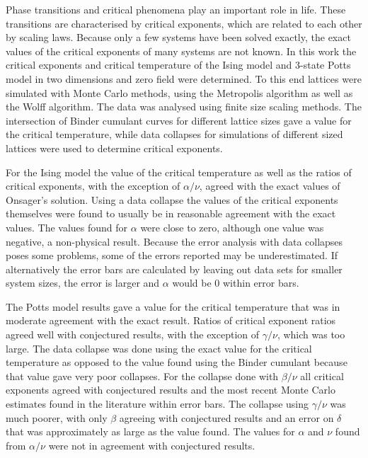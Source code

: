 \documentclass[11pt, a4paper]{report} %
\begin{document}
Phase transitions and critical phenomena play an important role in life.
These transitions are characterised by critical exponents, which are related to each other by scaling laws.
Because only a few systems have been solved exactly, the exact values of the critical exponents of many systems are not known.
In this work the critical exponents and critical temperature of the Ising model and 3-state Potts model in two dimensions and zero field were determined.
To this end lattices were simulated with Monte Carlo methods, using the Metropolis algorithm as well as the Wolff algorithm.
The data was analysed using finite size scaling methods.
The intersection of Binder cumulant curves for different lattice sizes gave a value for the critical temperature, while data collapses for simulations of different sized lattices were used to determine critical exponents.

For the Ising model the value of the critical temperature as well as the ratios of critical exponents, with the exception of \(\alpha/\nu\), agreed with the exact values of Onsager's solution.
Using a data collapse the values of the critical exponents themselves were found to usually be in reasonable agreement with the exact values. The values found for \(\alpha\) were close to zero, although one value was negative, a non-physical result.
Because the error analysis with data collapses poses some problems, some of the errors reported may be underestimated.
If alternatively the error bars are calculated by leaving out data sets for smaller system sizes, the error is larger and \(\alpha\) would be 0 within error bars.

The Potts model results gave a value for the critical temperature that was in moderate agreement with the exact result.
Ratios of critical exponent ratios agreed well with conjectured results, with the exception of \(\gamma/\nu\), which was too large.
The data collapse was done using the exact value for the critical temperature as opposed to the value found using the Binder cumulant because that value gave very poor collapses.
For the collapse done with \(\beta/\nu\) all critical exponents agreed with conjectured results and the most recent Monte Carlo estimates found in the literature within error bars.
The collapse using \(\gamma/\nu\) was much poorer, with only \(\beta\) agreeing with conjectured results and an error on \(\delta\) that was approximately as large as the value found.
The values for \(\alpha\) and \(\nu\) found from \(\alpha/\nu\) were not in agreement with conjectured results.
\end{document}
